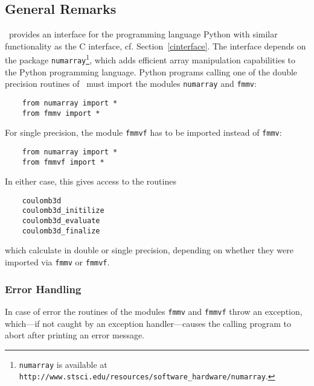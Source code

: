 \subsection{General Remarks}
\fmmv\ provides an interface for the programming language
Python with similar functionality as the C interface, 
cf. Section~\ref{cinterface}.
The interface depends on the package \verb|numarray|\footnote{{\tt numarray}
is available at {\tt http://www.stsci.edu/resources/software\_hardware/numarray}.},
which
adds efficient array manipulation capabilities to the Python programming
language.
Python programs calling one of the double precision
routines of \fmmv\ must import
the modules \verb|numarray| and \verb|fmmv|:
\begin{verbatim}
    from numarray import *
    from fmmv import *
\end{verbatim}
For single precision, the module \verb|fmmvf| has to be imported instead
of \verb|fmmv|:
\begin{verbatim}
    from numarray import *
    from fmmvf import *
\end{verbatim}
In either case, this gives access to the routines
\begin{verbatim}
    coulomb3d
    coulomb3d_initilize
    coulomb3d_evaluate
    coulomb3d_finalize
\end{verbatim}
which calculate in double or single precision, depending on whether they 
were imported via \verb|fmmv| or \verb|fmmvf|.
\subsubsection*{Error Handling}
In case of error the routines of the modules \verb|fmmv|
and \verb|fmmvf|
throw an exception, 
which---if not caught by an exception handler---causes 
the calling program to abort after printing an error message.

